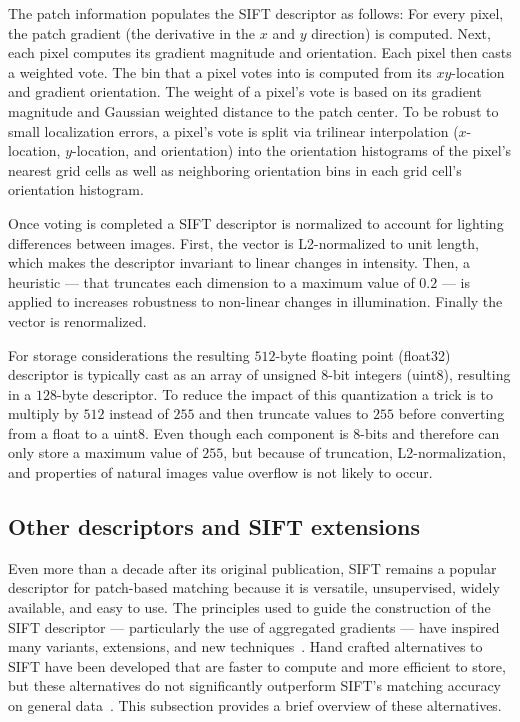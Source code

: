         The patch information populates the SIFT descriptor as follows: For every pixel, the patch gradient (the
        derivative in the $x$ and $y$ direction) is computed. Next, each pixel computes its gradient magnitude and
        orientation. Each pixel then casts a weighted vote. The bin that a pixel votes into is computed from its
        $xy$-location and gradient orientation. The weight of a pixel's vote is based on its gradient magnitude and
        Gaussian weighted distance to the patch center. To be robust to small localization errors, a pixel's vote
        is split via trilinear interpolation ($x$-location, $y$-location, and orientation) into the orientation
        histograms of the pixel's nearest grid cells as well as neighboring orientation bins in each grid cell's
        orientation histogram.

        Once voting is completed a SIFT descriptor is normalized to account for lighting differences between
        images. First, the vector is L2-normalized to unit length, which makes the descriptor invariant to linear
        changes in intensity. Then, a heuristic --- that truncates each dimension to a maximum value of $0.2$ ---
        is applied to increases robustness to non-linear changes in illumination. Finally the vector is
        renormalized.

        For storage considerations the resulting $512$-byte floating point (float32) descriptor is typically cast
          as an array of unsigned $8$-bit integers (uint8), resulting in a $128$-byte descriptor.
        To reduce the impact of this quantization a trick is to multiply by $512$ instead of $255$ and then
          truncate values to $255$ before converting from a float to a uint8.
        Even though each component is $8$-bits and therefore can only store a maximum value of $255$, but because
          of truncation, L2-normalization, and properties of natural images value overflow is not likely to occur.
    
       \vizfeatrow{}

    \subsection{Other descriptors and SIFT extensions}
        Even more than a decade after its original publication, SIFT remains a popular descriptor for patch-based
        matching because it is versatile, unsupervised, widely available, and easy to use. The principles used to
        guide the construction of the SIFT descriptor --- particularly the use of aggregated gradients --- have
        inspired many variants, extensions, and new techniques~\cite{mikolajczyk_performance_2005,
        dalal_histograms_2005, bay_surf_2006}. Hand crafted alternatives to SIFT have been developed that are
        faster to compute and more efficient to store, but these alternatives do not significantly outperform
        SIFT's matching accuracy on general data~\cite{lowe_distinctive_2004, mikolajczyk_performance_2005,
        alahi_freak_2012}. This subsection provides a brief overview of these alternatives.

